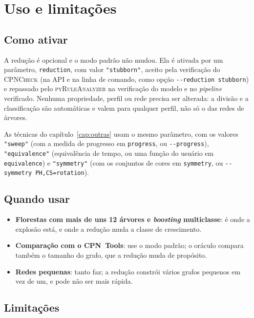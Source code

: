 \documentclass[11pt,a4paper]{report}
\newcommand{\cpn}{\textsc{CPNCheck}}
\newcommand{\pyra}{\textsc{pyRuleAnalyzer}}
\newcommand{\cpntools}{CPN~Tools}
\newcommand{\code}[1]{\texttt{\small #1}}
\theoremstyle{definition}
\begin{document}
\chapter{Uso e limitações}
\label{cap:uso}

\section{Como ativar}

A redução é opcional e o modo padrão não mudou. Ela é ativada por um
parâmetro, \code{reduction}, com valor \code{"stubborn"}, aceito pela
verificação do \cpn{} (na API e na linha de comando, como opção
\code{-{}-reduction stubborn}) e repassado pelo \pyra{} na verificação do modelo
e no \emph{pipeline} verificado. Nenhuma propriedade, perfil ou rede precisa
ser alterada: a divisão e a classificação são automáticas e valem para
qualquer perfil, não só o das redes de árvores.

As técnicas do capítulo~\ref{cap:outras} usam o mesmo parâmetro, com os
valores \code{"sweep"} (com a medida de progresso em \code{progress}, ou
\code{-{}-progress}), \code{"equivalence"} (equivalência de tempo, ou uma
função do usuário em \code{equivalence}) e \code{"symmetry"} (com os conjuntos
de cores em \code{symmetry}, ou \code{-{}-symmetry PH,CS=rotation}).

\section{Quando usar}

\begin{itemize}[leftmargin=1.4em]
  \item \textbf{Florestas com mais de uns 12 árvores e \emph{boosting}
        multiclasse}: é onde a explosão está, e onde a redução muda a classe
        de crescimento.
  \item \textbf{Comparação com o \cpntools{}}: use o modo padrão; o oráculo
        compara também o tamanho do grafo, que a redução muda de propósito.
  \item \textbf{Redes pequenas}: tanto faz; a redução constrói vários grafos
        pequenos em vez de um, e pode não ser mais rápida.
\end{itemize}

\section{Limitações}
\end{document}

